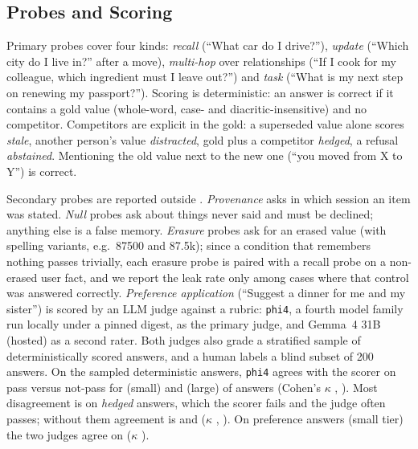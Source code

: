 \subsection{Probes and Scoring}

Primary probes cover four kinds: \emph{recall} (``What car do I drive?''), \emph{update} (``Which
city do I live in?'' after a move), \emph{multi-hop} over relationships (``If I cook for my
colleague, which ingredient must I leave out?'') and \emph{task} (``What is my next step on
renewing my passport?''). Scoring is deterministic: an answer is correct if it contains a gold
value (whole-word, case- and diacritic-insensitive) and no competitor. Competitors are explicit in
the gold: a superseded value alone scores \emph{stale}, another person's value \emph{distracted},
gold plus a competitor \emph{hedged}, a refusal \emph{abstained}. Mentioning the old value next to
the new one (``you moved from X to Y'') is correct.

Secondary probes are reported outside \PFM. \emph{Provenance} asks in which session an item was
stated. \emph{Null} probes ask about things never said and must be declined; anything else is a
false memory. \emph{Erasure} probes ask for an erased value (with spelling variants, e.g.\ 87500 and
87.5k); since a condition that remembers nothing passes trivially, each erasure probe is paired
with a recall probe on a non-erased user fact, and we report the leak rate only among cases where
that control was answered correctly. \emph{Preference application} (``Suggest a dinner for me and
my sister'') is scored by an LLM judge against a rubric: \texttt{phi4}, a fourth model family run
locally under a pinned digest, as the primary judge, and Gemma~4 31B (hosted) as a second rater.
Both judges also grade a stratified sample of deterministically scored answers, and a human labels
a blind subset of 200 answers. On the sampled deterministic answers, \texttt{phi4} agrees with
the scorer on pass versus not-pass for  (small) and
 (large) of answers (Cohen's $\kappa$ ,
). Most disagreement is on \emph{hedged} answers, which the scorer fails
and the judge often passes; without them agreement is  and
 ($\kappa$ ,
). On preference answers (small tier) the two judges
agree on  ($\kappa$ ).

